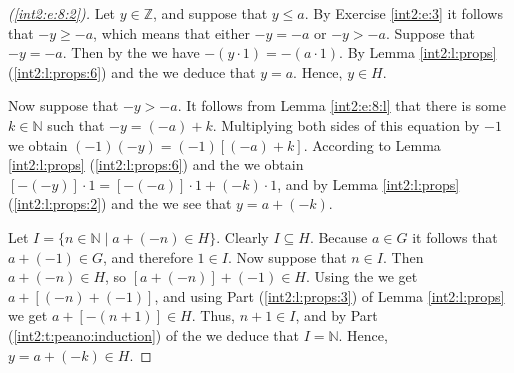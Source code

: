 \begin{proof}[(\ref{int2:e:8:2})]
	Let $y \in \mathbb{Z}$, and suppose that $y \leq a$. By Exercise \ref{int2:e:3} it follows that ${-y \geq -a}$, which means that either $-y = -a$ or $-y > -a$. Suppose that $-y = -a$. Then by the  we have $-(y \cdot 1) = -(a \cdot 1)$. By Lemma \ref{int2:l:props} (\ref{int2:l:props:6}) and the  we deduce that $y = a$. Hence, $y \in H$.

	Now suppose that $-y > -a$. It follows from Lemma \ref{int2:e:8:l} that there is some ${k \in \mathbb{N}}$ such that $-y = (-a) + k$. Multiplying both sides of this equation by $-1$ we obtain ${(-1)(-y) = (-1)[(-a) + k]}$. According to Lemma \ref{int2:l:props} (\ref{int2:l:props:6}) and the  we obtain $[-(-y)] \cdot 1 = [-(-a)] \cdot 1 + (-k) \cdot 1$, and by Lemma \ref{int2:l:props} (\ref{int2:l:props:2}) and the  we see that $y = a + (-k)$.

	Let $I = \{ n \in \mathbb{N} \mid a + (-n) \in H \}$. Clearly $I \subseteq H$. Because $a \in G$ it follows that $a + (-1) \in G$, and therefore $1 \in I$. Now suppose that $n \in I$. Then $a + (-n) \in H$, so $[a + (-n)] + (-1) \in H$. Using the  we get $a + [(-n) + (-1)]$, and using Part (\ref{int2:l:props:3}) of Lemma \ref{int2:l:props} we get $a + [-(n + 1)] \in H$. Thus, $n + 1 \in I$, and by Part (\ref{int2:t:peano:induction}) of the  we deduce that $I = \mathbb{N}$. Hence, $y = a + (-k) \in H$.
\end{proof}
